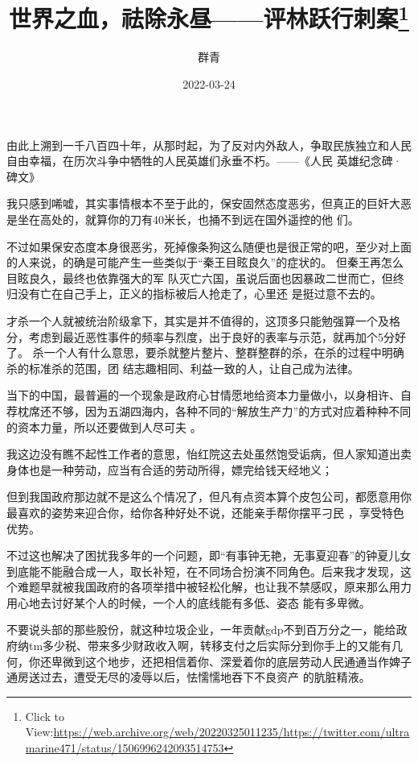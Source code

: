 \documentclass{article}
\title{世界之血，祛除永昼——评林跃行刺案\footnote{Click to View:\url{https://web.archive.org/web/20220325011235/https://twitter.com/ultramarine471/status/1506996242093514753}}}
\author{群青}
\date{2022-03-24}
\begin{document}

\maketitle


\Large

﻿由此上溯到一千八百四十年，从那时起，为了反对内外敌人，争取民族独立和人民自由幸福，在历次斗争中牺牲的人民英雄们永垂不朽。——《人民
英雄纪念碑·碑文》 

我只感到唏嘘，其实事情根本不至于此的，保安固然态度恶劣，但真正的巨奸大恶是坐在高处的，就算你的刀有40米长，也捅不到远在国外遥控的他
们。 

不过如果保安态度本身很恶劣，死掉像条狗这么随便也是很正常的吧，至少对上面的人来说，的确是可能产生一些类似于“秦王目眩良久”的症状的。
但秦王再怎么目眩良久，最终也依靠强大的军
\newpage
队灭亡六国，虽说后面也因暴政二世而亡，但终归没有亡在自己手上，正义的指标被后人抢走了，心里还
是挺过意不去的。 

才杀一个人就被统治阶级拿下，其实是并不值得的，这顶多只能勉强算一个及格分，考虑到最近恶性事件的频率与烈度，出于良好的表率与示范，就再加个5分好了。
杀一个人有什么意思，要杀就整片整片、整群整群的杀，在杀的过程中明确杀的标准杀的范围，团
结志趣相同、利益一致的人，让自己成为法律。 

当下的中国，最普遍的一个现象是政府心甘情愿地给资本力量做小，以身相许、自荐枕席还不够，因为五湖四海内，各种不同的“解放生产力”的方式对应着种种不同的资本力量，所以还要做到人尽可夫
。 

我这边没有瞧不起性工作者的意思，怡红院这去处虽然饱受诟病，但人家知道出卖身体也是一种劳动，应当有合适的劳动所得，嫖完给钱天经地义；
\newpage

但到我国政府那边就不是这么个情况了，但凡有点资本算个皮包公司，都愿意用你最喜欢的姿势来迎合你，给你各种好处不说，还能亲手帮你摆平刁民
，享受特色优势。 

不过这也解决了困扰我多年的一个问题，即“有事钟无艳，无事夏迎春”的钟夏儿女到底能不能融合成一人，取长补短，在不同场合扮演不同角色。后来我才发现，这个难题早就被我国政府的各项举措中被轻松化解，也让我不禁感叹，原来那么用力用心地去讨好某个人的时候，一个人的底线能有多低、姿态
能有多卑微。 

不要说头部的那些股份，就这种垃圾企业，一年贡献gdp不到百万分之一，能给政府纳tm多少税、带来多少财政收入啊，转移支付之后实际分到你手上的又能有几何，你还卑微到这个地步，还把相信着你、深爱着你的底层劳动人民通通当作婢子通房送过去，遭受无尽的凌辱以后，怯懦懦地吞下不良资产
的肮脏精液。 

\newpage
\end{document}
